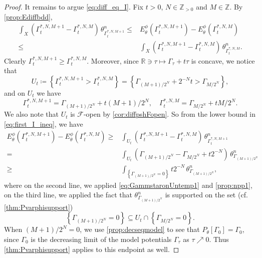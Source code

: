 \begin{proof}
It remains to argue \eqref{eq:diff_eq_I}. Fix $t>0$, $N\in \mathbb{Z}_{>0}$ and $M\in \mathbb{Z}$. By \cref{prop:Ediffbdd},
    \begin{equation}\label{eq:first_I_ineq}
    \begin{aligned}
        \int_X \left(\Gamma_t^{*,N,M+1}-\Gamma_t^{*,N,M}\right)\,\theta^n_{\Gamma_t^{*,N,M+1}}\leq & E_{\theta}^{\phi}\left(\Gamma_t^{*,N,M+1}\right)-E_{\theta}^{\phi}\left(\Gamma_t^{*,N,M}\right)\\
        \leq & \int_X \left(\Gamma_t^{*,N,M+1}-\Gamma_t^{*,N,M}\right)\,\theta^n_{\Gamma_t^{*,N,M}}.
    \end{aligned}
    \end{equation}
    Clearly $\Gamma_t^{*,N,M+1} \geq \Gamma_t^{*,N,M}$. Moreover, since $\mathbb{R}\ni \tau\mapsto \Gamma_{\tau}+t\tau$ is concave, we notice that
    \[
        U_t \coloneqq\left\{\Gamma^{*,N,M+1}_t>\Gamma^{*,N,M}_t\right\} = \left\{\Gamma_{(M+1)/2^N} +  2^{-N}t >\Gamma_{M/2^N}\right\},
    \]
    and on $U_t$ we have
    \begin{equation}\label{eq:GammstaronUntemp1}
        \Gamma_t^{*,N,M+1} = \Gamma_{(M+1)/2^N} + t (M+1)/2^{N},\quad \Gamma_t^{*,N,M} = \Gamma_{M/2^N} + t M /2^{N}.
    \end{equation}
     We also note that $U_t$ is $\mathcal{F}$-open by \cref{cor:diffpshFopen}.
     So from the lower bound in \eqref{eq:first_I_ineq}, we have
     \[
     \begin{aligned}
     E_{\theta}^{\phi}\left(\Gamma_t^{*,N,M+1}\right)-E_{\theta}^{\phi}\left(\Gamma_t^{*,N,M}\right)\geq & \int_{U_t} \left(\Gamma_t^{*,N,M+1}-\Gamma_t^{*,N,M}\right)\,\theta^n_{\Gamma_t^{*,N,M+1}}\\
     = & \int_{U_t} \left(\Gamma_{(M+1)/2^N}-\Gamma_{M/2^N}+t2^{-N}\right)\,\theta^n_{\Gamma_{(M+1)/2^N}}\\
     \geq & \int_{\left\{\Gamma_{(M+1)/2^N}=0\right\}}t2^{-N}\,\theta^n_{\Gamma_{(M+1)/2^N}},
     \end{aligned}
     \]
     where on the second line, we applied \eqref{eq:GammstaronUntemp1} and \cref{prop:npp1}, on the third line, we applied the fact that $\theta_{\Gamma_{(M+1)/2^N}}^n$ is supported on the set (cf. \cref{thm:Pvarphisupport})
     \[
         \left\{\Gamma_{(M+1)/2^N}=0\right\}\subseteq U_t\cap \left\{\Gamma_{M/2^N}=0\right\}.
     \]
     When $(M+1)/2^N=0$, we use \cref{prop:decseqmodel} to see that $P_\theta[\Gamma_0]=\Gamma_0$, since $\Gamma_0$ is the decreasing limit of the model potentials $\Gamma_\tau$ as $\tau\nearrow 0$. Thus \cref{thm:Pvarphisupport} applies to this endpoint as well.


\end{proof}
